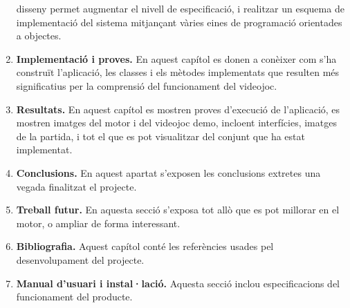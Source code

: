 \begin{enumerate}
disseny permet augmentar el nivell de especificació, i realitzar un esquema
de implementació del sistema mitjançant vàries eines de programació orientades
a objectes.
\item \textbf{Implementació i proves.} En aquest capítol es donen a conèixer com s’ha
construït l’aplicació, les classes i els mètodes implementats que resulten
més significatius per la comprensió del funcionament del videojoc.
\item \textbf{Resultats.} En aquest capítol es mostren proves d’execució de l’aplicació,
es mostren imatges del motor i del videojoc demo, incloent interfícies, imatges de la partida,
i tot el que es pot visualitzar del conjunt que ha estat implementat.
\item \textbf{Conclusions.} En aquest apartat s’exposen les conclusions extretes una
vegada finalitzat el projecte.
\item \textbf{Treball futur.} En aquesta secció s’exposa tot allò que es pot millorar en
el motor, o ampliar de forma interessant.
\item \textbf{Bibliografia.} Aquest capítol conté les referències usades pel desenvolupament
del projecte.
\item \textbf{Manual d’usuari i instal·lació.} Aquesta secció inclou especificacions
del funcionament del producte.
\end{enumerate}
